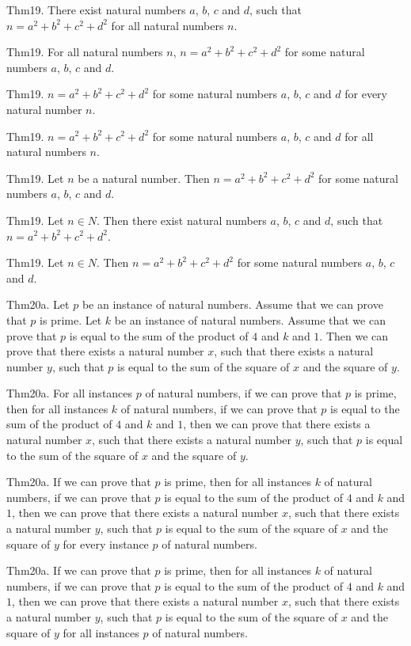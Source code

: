 \documentclass{article}
\begin{document}
Thm19. There exist natural numbers $a$, $b$, $c$ and $d$, such that $n = a ^{ 2}+ b ^{ 2}+ c ^{ 2}+ d ^{ 2}$ for all natural numbers $n$.

Thm19. For all natural numbers $n$, $n = a ^{ 2}+ b ^{ 2}+ c ^{ 2}+ d ^{ 2}$ for some natural numbers $a$, $b$, $c$ and $d$.

Thm19. $n = a ^{ 2}+ b ^{ 2}+ c ^{ 2}+ d ^{ 2}$ for some natural numbers $a$, $b$, $c$ and $d$ for every natural number $n$.

Thm19. $n = a ^{ 2}+ b ^{ 2}+ c ^{ 2}+ d ^{ 2}$ for some natural numbers $a$, $b$, $c$ and $d$ for all natural numbers $n$.

Thm19. Let $n$ be a natural number. Then $n = a ^{ 2}+ b ^{ 2}+ c ^{ 2}+ d ^{ 2}$ for some natural numbers $a$, $b$, $c$ and $d$.

Thm19. Let $n \in N$. Then there exist natural numbers $a$, $b$, $c$ and $d$, such that $n = a ^{ 2}+ b ^{ 2}+ c ^{ 2}+ d ^{ 2}$.

Thm19. Let $n \in N$. Then $n = a ^{ 2}+ b ^{ 2}+ c ^{ 2}+ d ^{ 2}$ for some natural numbers $a$, $b$, $c$ and $d$.

Thm20a. Let $p$ be an instance of natural numbers. Assume that we can prove that $p$ is prime. Let $k$ be an instance of natural numbers. Assume that we can prove that $p$ is equal to the sum of the product of $4$ and $k$ and $1$. Then we can prove that there exists a natural number $x$, such that there exists a natural number $y$, such that $p$ is equal to the sum of the square of $x$ and the square of $y$.

Thm20a. For all instances $p$ of natural numbers, if we can prove that $p$ is prime, then for all instances $k$ of natural numbers, if we can prove that $p$ is equal to the sum of the product of $4$ and $k$ and $1$, then we can prove that there exists a natural number $x$, such that there exists a natural number $y$, such that $p$ is equal to the sum of the square of $x$ and the square of $y$.

Thm20a. If we can prove that $p$ is prime, then for all instances $k$ of natural numbers, if we can prove that $p$ is equal to the sum of the product of $4$ and $k$ and $1$, then we can prove that there exists a natural number $x$, such that there exists a natural number $y$, such that $p$ is equal to the sum of the square of $x$ and the square of $y$ for every instance $p$ of natural numbers.

Thm20a. If we can prove that $p$ is prime, then for all instances $k$ of natural numbers, if we can prove that $p$ is equal to the sum of the product of $4$ and $k$ and $1$, then we can prove that there exists a natural number $x$, such that there exists a natural number $y$, such that $p$ is equal to the sum of the square of $x$ and the square of $y$ for all instances $p$ of natural numbers.
\end{document}
